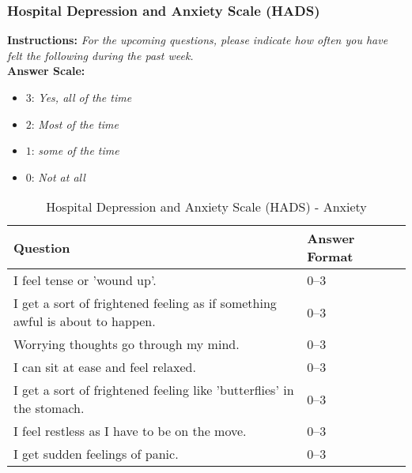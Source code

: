 \subsubsection{Hospital Depression and Anxiety Scale (HADS)}
\textbf{Instructions:} \emph{For the upcoming questions, please indicate how often you have felt the following during the past week.}
\\
\textbf{Answer Scale:}
\begin{itemize}
    \item $3$: \emph{Yes, all of the time}
    \item $2$: \emph{Most of the time}
    \item $1$: \emph{some of the time}
    \item $0$: \emph{Not at all}
\end{itemize}
\begin{table}[H]
    \centering
    \renewcommand{\arraystretch}{1.2}
    \begin{tabularx}{\textwidth}{|l|X|l|}
        \hline
        \textbf{Question} & \textbf{Answer Format} \\ \hline
        I feel tense or 'wound up'. & 0--3 \\ \hline
        I get a sort of frightened feeling as if something awful is about to happen. & 0--3 \\ \hline
        Worrying thoughts go through my mind. & 0--3 \\ \hline
        I can sit at ease and feel relaxed. & 0--3 \\ \hline
        I get a sort of frightened feeling like 'butterflies' in the stomach. & 0--3 \\ \hline
        I feel restless as I have to be on the move. & 0--3 \\ \hline
        I get sudden feelings of panic. & 0--3 \\ \hline
    \end{tabularx}
    \caption{Hospital Depression and Anxiety Scale (HADS) - Anxiety}
    \label{tab:hads-anxiety}
\end{table}

